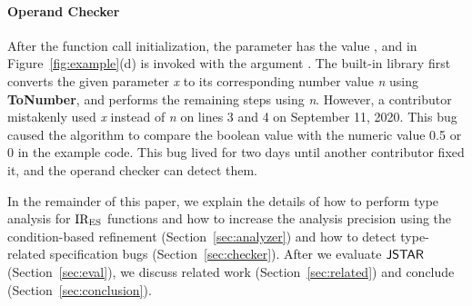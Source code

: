 \paragraph{Operand Checker} After the function call initialization, the
parameter  has the value , and  in Figure~\ref{fig:example}(d) is invoked
with the argument .  The  built-in library first
converts the given parameter \textit{x} to its corresponding number value
\textit{n} using \textbf{ToNumber}, and performs the remaining
steps using \textit{n}.  However, a contributor mistakenly used
\textit{x} instead of \textit{n} on lines 3 and 4 on September 11, 2020.
This bug caused the algorithm to compare the boolean value  with the
numeric value 0.5 or 0 in the example code.
This bug lived for two days until another contributor fixed it, and
the operand checker can detect them.

In the remainder of this paper, we explain the details of how to perform type
analysis for ${\text{IR}_\text{ES}}$ functions and how to increase the analysis precision using
the condition-based refinement (Section~\ref{sec:analyzer}) and how to detect
type-related specification bugs (Section~\ref{sec:checker}).  After we evaluate $\tool$
(Section~\ref{sec:eval}), we discuss related work (Section~\ref{sec:related})
and conclude (Section~\ref{sec:conclusion}).
